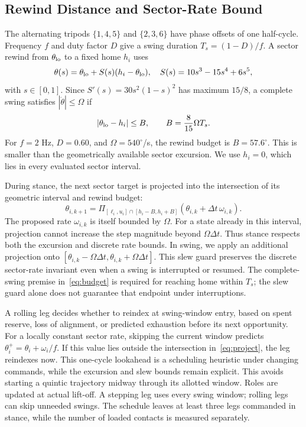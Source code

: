 \documentclass[letterpaper,10pt,conference]{ieeeconf}
\begin{document}
\subsection{Rewind Distance and Sector-Rate Bound}
The alternating tripods $\{1,4,5\}$ and $\{2,3,6\}$ have phase offsets of one half-cycle. Frequency $f$ and duty factor $D$ give a swing duration $T_s=(1-D)/f$. A sector rewind from $\theta_{\rm lo}$ to a fixed home $h_i$ uses
\begin{equation}
 \theta(s)=\theta_{\rm lo}+S(s)(h_i-\theta_{\rm lo}),\quad
 S(s)=10s^3-15s^4+6s^5,
\end{equation}
with $s\in[0,1]$. Since $S'(s)=30s^2(1-s)^2$ has maximum $15/8$, a complete swing satisfies $|\dot\theta|\le\Omega$ if
\begin{equation}
 |\theta_{\rm lo}-h_i|\le B,\qquad B=\frac{8}{15}\Omega T_s.\label{eq:budget}
\end{equation}
For $f=2$ Hz, $D=0.60$, and $\Omega=540^\circ$/s, the rewind budget is $B=57.6^\circ$. This is smaller than the geometrically available sector excursion. We use $h_i=0$, which lies in every evaluated sector interval.

During stance, the next sector target is projected into the intersection of its geometric interval and rewind budget:
\begin{equation}
 \theta_{i,k+1}=\Pi_{[\ell_i,u_i]\cap[h_i-B,h_i+B]}
     (\theta_{i,k}+\Delta t\,\omega_{i,k}).\label{eq:project}
\end{equation}
The proposed rate $\omega_{i,k}$ is itself bounded by $\Omega$. For a state already in this interval, projection cannot increase the step magnitude beyond $\Omega\Delta t$. Thus stance respects both the excursion and discrete rate bounds. In swing, we apply an additional projection onto $[\theta_{i,k}-\Omega\Delta t,\theta_{i,k}+\Omega\Delta t]$. This slew guard preserves the discrete sector-rate invariant even when a swing is interrupted or resumed. The complete-swing premise in~\eqref{eq:budget} is required for reaching home within $T_s$; the slew guard alone does not guarantee that endpoint under interruptions.

A rolling leg decides whether to reindex at swing-window entry, based on spent reserve, loss of alignment, or predicted exhaustion before its next opportunity. For a locally constant sector rate, skipping the current window predicts $\theta_i^+=\theta_i+\omega_i/f$. If this value lies outside the intersection in~\eqref{eq:project}, the leg reindexes now. This one-cycle lookahead is a scheduling heuristic under changing commands, while the excursion and slew bounds remain explicit. This avoids starting a quintic trajectory midway through its allotted window. Roles are updated at actual lift-off. A stepping leg uses every swing window; rolling legs can skip unneeded swings. The schedule leaves at least three legs commanded in stance, while the number of loaded contacts is measured separately.
\end{document}

